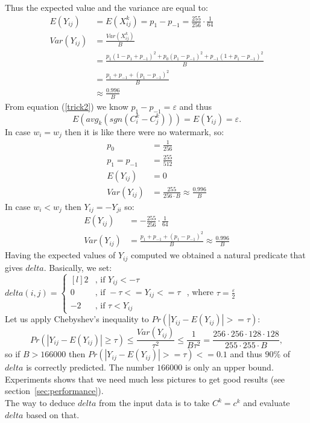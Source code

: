 \documentclass[varwidth]{standalone}
\begin{document}
Thus the expected value and the variance are equal to:
\begin{align*}
E(Y_{ij}) &= E(X^k_{ij}) = p_1 - p_{-1}=\frac{255}{256}\cdot \frac{1}{64}\\
Var(Y_{ij}) &= \frac{Var(X^k_{ij})}{B}\\
            &= \frac{p_1(1-p_1+p_{-1})^2 + p_0(p_1-p_{-1})^2 + p_{-1}(1+p_1-p_{-1})^2}{B}\\
            &= \frac{p_1 + p_{-1} + (p_1-p_{-1})^2}{B}\\
            &\approx \frac{0.996}{B}
\end{align*}
From equation (\ref{trick2}) we know $p_1 - p_{-1} = \varepsilon$ and thus
\begin{equation}
\label{eq:avg:eps}
E(avg_k(sgn(C^k_i-C^k_j))) = E(Y_{ij}) = \varepsilon.
\end{equation}
In case $w_i = w_j$ then it is like there were no watermark, so:\\
\begin{align*}
p_0 &= \frac{1}{256}\\
p_1 = p_{-1} &= \frac{255}{512}\\
E(Y_{ij}) &= 0\\
Var(Y_{ij}) &= \frac{255}{256\cdot B} \approx \frac{0.996}{B}
\end{align*}
In case $w_i < w_j$ then $Y_{ij} = -Y_{ji}$ so:\\
\begin{align*}
E(Y_{ij}) &= -\frac{255}{256}\cdot \frac{1}{64}\\
Var(Y_{ij}) &= \frac{p_1 + p_{-1} + (p_1-p_{-1})^2}{B} \approx \frac{0.996}{B}
\end{align*}
Having the expected values of $Y_{ij}$ computed we obtained a natural predicate
that gives $delta$. Basically, we set:\\
$delta(i, j) = \left\{
  \begin{matrix*}[l]
    2&\text{, if } Y_{ij} < -\tau\\
    0&\text{, if } -\tau <= Y_{ij} <= \tau\\
    -2&\text{, if } \tau < Y_{ij}
  \end{matrix*}\right.$ , where $\tau = \frac{\varepsilon}{2}$\\
Let us apply Chebyshev's inequality to $Pr(|Y_{ij} - E(Y_{ij})| >= \tau)$:
$$
Pr(|Y_{ij} - E(Y_{ij})| \geq \tau)
  \leq \frac{Var(Y_{ij})}{\tau^2}
  \leq \frac{1}{B\tau^2}
  = \frac{256\cdot 256\cdot 128\cdot 128}{255\cdot 255\cdot B},
$$
so if $B > 166000$ then $Pr(|Y_{ij} - E(Y_{ij})| >= \tau) <= 0.1$ and thus
$90$\% of $delta$ is correctly predicted. The number $166000$ is only an upper bound. Experiments shows
that we need much less pictures to get good results (see section~\ref{sec:performance}).\\
The way to deduce $delta$ from the input data is to take $C^k = c^k$ and
evaluate $delta$ based on that.
\end{document}
